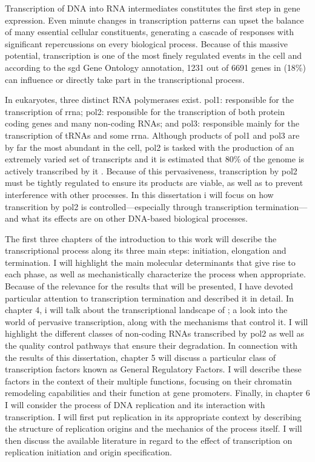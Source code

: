 Transcription of DNA into RNA intermediates constitutes the first step in gene expression.
Even minute changes in transcription patterns can upset the balance of many essential cellular constituents, generating a cascade of responses with significant repercussions on every biological process.
Because of this massive potential, transcription is one of the most finely regulated events in the cell and according to the \gls{sgd} \cite{cherry:2012:saccharomyces} Gene Ontology annotation, 1231 out of 6691 genes in \cer{} (18\%) can influence or directly take part in the transcriptional process.

In eukaryotes, three distinct RNA polymerases exist. 
\gls{pol1}: responsible for the transcription of \gls{rrna}; \gls{pol2}: responsible for the transcription of both protein coding genes and many non-coding RNAs; and \gls{pol3}: responsible mainly for the transcription of tRNAs and some \gls{rrna}.
Although products of \gls{pol1} and \gls{pol3} are by far the most abundant in the cell, \gls{pol2} is tasked with the production of an extremely varied set of transcripts and it is estimated that 80\% of the genome is actively transcribed by it \cite{david:2006:highresolution}. 
Because of this pervasiveness, transcription by \gls{pol2} must be tightly regulated to ensure its products are viable, as well as to prevent interference with other processes.
In this dissertation i will focus on how transcrition by \gls{pol2} is controlled---especially through transcription termination---and what its effects are on other DNA-based biological processes.

The first three chapters of the introduction to this work will describe the transcriptional process along its three main steps: initiation, elongation and termination. I will highlight the main molecular determinants that give rise to each phase, as well as mechanistically characterize the process when appropriate. 
Because of the relevance for the results that will be presented, I have devoted particular attention to transcription termination and described it in detail.
In chapter 4, i will talk about the transcriptional landscape of \cer{}; a look into the world of pervasive transcription, along with the mechanisms that control it. I will highlight the different classes of non-coding RNAs transcribed by \gls{pol2} as well as the quality control pathways that ensure their degradation.
In connection with the results of this dissertation, chapter 5 will discuss a particular class of transcription factors known as General Regulatory Factors. I will describe these factors in the context of their multiple functions, focusing on their chromatin remodeling capabilities and their function at gene promoters.
Finally, in chapter 6 I will consider the process of DNA replication and its interaction with transcription.
I will first put replication in its appropriate context by describing the structure of replication origins and the mechanics of the process itself. I will then discuss the available literature in regard to the effect of transcription on replication initiation and origin specification.

